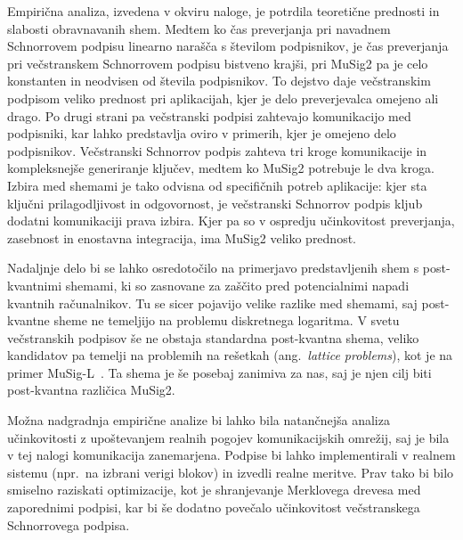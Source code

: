 Empirična analiza, izvedena v okviru naloge, je potrdila teoretične prednosti in slabosti obravnavanih
shem. Medtem ko čas preverjanja pri navadnem Schnorrovem podpisu linearno narašča s številom
podpisnikov, je čas preverjanja pri večstranskem Schnorrovem podpisu bistveno krajši, pri MuSig2 pa
je celo konstanten in neodvisen od števila podpisnikov. To dejstvo daje večstranskim podpisom veliko
prednost pri aplikacijah, kjer je delo preverjevalca omejeno ali drago. Po drugi strani pa večstranski
podpisi zahtevajo komunikacijo med podpisniki, kar lahko predstavlja oviro v primerih, kjer je omejeno
delo podpisnikov. 
Večstranski Schnorrov podpis zahteva tri kroge komunikacije in kompleksnejše generiranje ključev,
medtem ko MuSig2 potrebuje le dva kroga. Izbira med shemami je tako odvisna od specifičnih potreb
aplikacije: kjer sta ključni prilagodljivost in odgovornost, je večstranski Schnorrov podpis kljub
dodatni komunikaciji prava izbira. Kjer pa so v ospredju učinkovitost preverjanja, zasebnost in
enostavna integracija, ima MuSig2 veliko prednost.
%

Nadaljnje delo bi se lahko osredotočilo na primerjavo predstavljenih shem s post-kvantnimi shemami,
ki so zasnovane za zaščito pred potencialnimi napadi kvantnih računalnikov. Tu se sicer pojavijo
velike razlike med shemami, saj post-kvantne sheme ne temeljijo na problemu diskretnega logaritma.
V svetu večstranskih podpisov še ne obstaja standardna post-kvantna shema, veliko kandidatov pa temelji
na problemih na rešetkah (ang.\ \textit{lattice problems}), kot je na primer MuSig-L~\cite{boschini2022musigl}.
Ta shema je še posebaj zanimiva za nas, saj je njen cilj biti post-kvantna različica MuSig2.

Možna nadgradnja empirične analize bi lahko bila natančnejša analiza učinkovitosti z upoštevanjem realnih
pogojev komunikacijskih omrežij, saj je bila v tej nalogi komunikacija zanemarjena. Podpise bi lahko
implementirali v realnem sistemu (npr.\ na izbrani verigi blokov) in izvedli realne meritve.
Prav tako bi bilo smiselno raziskati optimizacije, kot je shranjevanje Merklovega drevesa med
zaporednimi podpisi, kar bi še dodatno povečalo učinkovitost večstranskega Schnorrovega podpisa.
